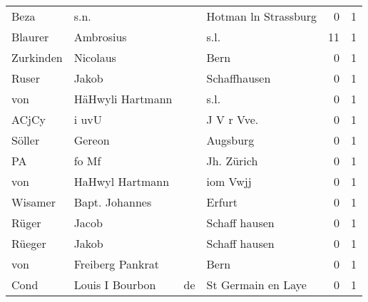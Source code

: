 \documentclass[10pt,a4paper,landscape]{article}
\begin{document}
\begin{longtable}{llllrr}
                     Beza &                               s.n. &             &                        Hotman ln Strassburg &          0 &         1 \\
                  Blaurer &                          Ambrosius &             &                                        s.l. &         11 &         1 \\
                Zurkinden &                           Nicolaus &             &                                        Bern &          0 &         1 \\
                    Ruser &                              Jakob &             &                                Schaffhausen &          0 &         1 \\
                      von &                   HäHwyli Hartmann &             &                                        s.l. &          0 &         1 \\
                    ACjCy &                              i uvU &             &                                 J V r Vve.  &          0 &         1 \\
                   Söller &                             Gereon &             &                                    Augsburg &          0 &         1 \\
                       PA &                              fo Mf &             &                                  Jh. Zürich &          0 &         1 \\
                      von &                    HaHwyl Hartmann &             &                                    iom Vwjj &          0 &         1 \\
                  Wisamer &                     Bapt. Johannes &             &                                      Erfurt &          0 &         1 \\
                    Rüger &                              Jacob &             &                               Schaff hausen &          0 &         1 \\
                   Rüeger &                              Jakob &             &                               Schaff hausen &          0 &         1 \\
                      von &                   Freiberg Pankrat &             &                                        Bern &          0 &         1 \\
                     Cond &                   Louis I  Bourbon &          de &                          St Germain en Laye &          0 &         1 \\

\end{longtable}
\end{document}
